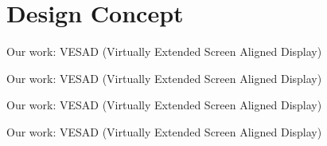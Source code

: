 \section{Design Concept}

\begin{frame}{Our work: VESAD (Virtually Extended Screen Aligned Display)}
  \vspace{-30px}
\end{frame}

\begin{frame}{Our work: VESAD (Virtually Extended Screen Aligned Display)}
  \vspace{-30px}
\end{frame}

\begin{frame}{Our work: VESAD (Virtually Extended Screen Aligned Display)}
  \vspace{-25px}
\end{frame}

\begin{frame}{Our work: VESAD (Virtually Extended Screen Aligned Display)}
  \vspace{-25px}
\end{frame}